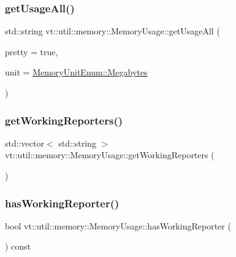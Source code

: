 \subsubsection{\texorpdfstring{get\+Usage\+All()}{getUsageAll()}}
{\footnotesize\ttfamily std\+::string vt\+::util\+::memory\+::\+Memory\+Usage\+::get\+Usage\+All (\begin{DoxyParamCaption}\item[{bool}]{pretty = {\ttfamily true},  }\item[{\hyperlink{namespacevt_1_1util_1_1memory_a64df3d84293b34009f78e2a1db2f9bb6}{Memory\+Unit\+Enum}}]{unit = {\ttfamily \hyperlink{namespacevt_1_1util_1_1memory_a64df3d84293b34009f78e2a1db2f9bb6a2276a1b157f2813f3b65d04c0b1c56f6}{Memory\+Unit\+Enum\+::\+Megabytes}} }\end{DoxyParamCaption})}

\mbox{\label{structvt_1_1util_1_1memory_1_1_memory_usage_a23bded824e4360e4389d9869c3bd7f18}} 
\subsubsection{\texorpdfstring{get\+Working\+Reporters()}{getWorkingReporters()}}
{\footnotesize\ttfamily std\+::vector$<$ std\+::string $>$ vt\+::util\+::memory\+::\+Memory\+Usage\+::get\+Working\+Reporters (\begin{DoxyParamCaption}{ }\end{DoxyParamCaption})}

\mbox{\label{structvt_1_1util_1_1memory_1_1_memory_usage_aee12dfad3c08673967dd1fcd6a6adfb5}} 
\subsubsection{\texorpdfstring{has\+Working\+Reporter()}{hasWorkingReporter()}}
{\footnotesize\ttfamily bool vt\+::util\+::memory\+::\+Memory\+Usage\+::has\+Working\+Reporter (\begin{DoxyParamCaption}{ }\end{DoxyParamCaption}) const}

